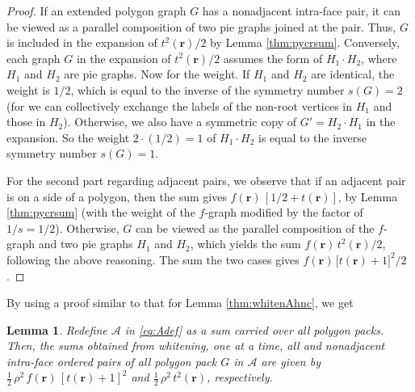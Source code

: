 \documentclass[preprint]{revtex4-1}
\newtheorem{lemm}[thrm]{Lemma}
\newcommand{\vct}[1]{\mathbf{#1}}
\providecommand{\vr}{} %
\renewcommand{\vr}{\vct{r}}
\newcommand{\A}{\mathcal{A}}
\begin{document}
\begin{proof}
If an extended polygon graph $G$ has a nonadjacent intra-face pair,
  it can be viewed as a parallel composition
  of two pie graphs joined at the pair.
%
Thus, $G$ is included in the expansion of $t^2(\vr)/2$
  by Lemma \ref{thm:pycrsum}.
%
Conversely,
  each graph $G$ in the expansion of $t^2(\vr)/2$
  assumes the form of $H_1 \cdot H_2$,
  where $H_1$ and $H_2$ are pie graphs.
%
Now for the weight.
%
If $H_1$ and $H_2$ are identical,
  the weight is $1/2$,
  which is equal to the inverse of
  the symmetry number $s(G) = 2$
  (for we can collectively exchange
  the labels of the non-root vertices in $H_1$
  and those in $H_2$).
%
Otherwise,
  we also have a symmetric copy of $G' = H_2 \cdot H_1$
  in the expansion.
So the weight $2\cdot(1/2) = 1$ of $H_1 \cdot H_2$
  is equal to the inverse symmetry number $s(G) = 1$.

For the second part regarding adjacent pairs,
  we observe that
  if an adjacent pair is on a side of a polygon,
  then the sum gives $f(\vr) \, [1/2 + t(\vr)]$,
  by Lemma \ref{thm:pycrsum}
  (with the weight of the $f$-graph
  modified by the factor of $1/s = 1/2$).
%
Otherwise,
  $G$ can be viewed as the parallel composition
  of the $f$-graph and two pie graphs $H_1$ and $H_2$,
%
which yields the sum $f(\vr) \, t^2(\vr)/2$,
  following the above reasoning.
%
The sum the two cases gives
  $f(\vr) \, \bigl[ t(\vr) + 1 \bigr]^2/2$.
\end{proof}



By using a proof similar to that for
Lemma \ref{thm:whitenAhnc},
we get

\begin{lemm}
Redefine $\A$ in \eqref{eq:Adef}
as a sum carried over all polygon packs.
Then, the sums obtained from whitening,
one at a time,
all and nonadjacent intra-face ordered pairs
of all polygon pack $G$ in $\A$
are given by
$\frac{1}{2} \, \rho^2 \, f(\vr) \, [t(\vr) + 1]^2$
and
$\frac{1}{2} \, \rho^2 \, t^2(\vr)$,
respectively.
\label{thm:whitenApy}
\end{lemm}
\end{document}
